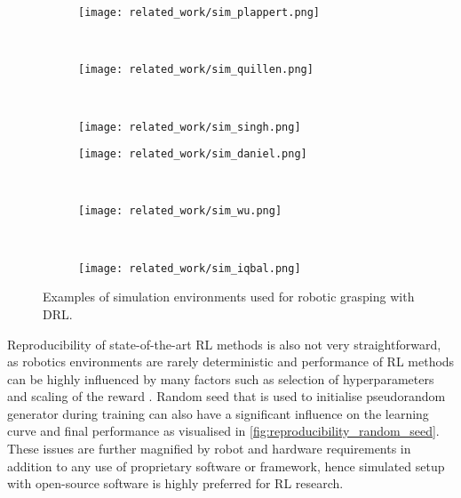 \begin{figure}[ht]
    \centering
    \begin{subfigure}[ht]{0.34\textwidth}
        \centering
        \texttt{[image: related\_work/sim\_plappert.png]}
        \caption*{\protect\citet{plappert_multi-goal_2018}}
    \end{subfigure}%
    ~
    \begin{subfigure}[ht]{0.3\textwidth}
        \centering
        \texttt{[image: related\_work/sim\_quillen.png]}
        \caption*{\protect\citet{quillen_deep_2018}}
    \end{subfigure}%
    ~
    \begin{subfigure}[ht]{0.34\textwidth}
        \centering
        \texttt{[image: related\_work/sim\_singh.png]}
        \caption*{\protect\citet{singh_end--end_2019}}
    \end{subfigure}%

    \smallskip

    \begin{subfigure}[ht]{0.34\textwidth}
        \centering
        \texttt{[image: related\_work/sim\_daniel.png]}
        \caption*{\protect\citet{daniel_deep_2020}}
    \end{subfigure}%
    ~
    \begin{subfigure}[ht]{0.3\textwidth}
        \centering
        \texttt{[image: related\_work/sim\_wu.png]}
        \caption*{\protect\citet{wu_generative_2020}}
    \end{subfigure}%
    ~
    \begin{subfigure}[ht]{0.34\textwidth}
        \centering
        \texttt{[image: related\_work/sim\_iqbal.png]}
        \caption*{\protect\citet{iqbal_toward_2020}}
    \end{subfigure}%
    \caption{Examples of simulation environments used for robotic grasping with DRL.}
    \label{fig:rw_simulation_envs}
\end{figure}

\newpage

Reproducibility of state-of-the-art RL methods is also not very straightforward, as robotics environments are rarely deterministic and performance of RL methods can be highly influenced by many factors such as selection of hyperparameters and scaling of the reward \cite{henderson_deep_2018}. Random seed that is used to initialise pseudorandom generator during training can also have a significant influence on the learning curve and final performance as visualised in \autoref{fig:reproducibility_random_seed}. These issues are further magnified by robot and hardware requirements in addition to any use of proprietary software or framework, hence simulated setup with open-source software is highly preferred for RL research.

